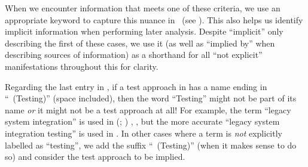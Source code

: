 
When we encounter information that meets one of these criteria, we use an
appropriate keyword to capture this nuance in \ourApproachGlossary{}\ifnotpaper\
    (see )\fi. This also helps us identify implicit
information when performing later analysis. Despite ``implicit'' only
describing the first of these cases, we use it (as well as ``implied by'' when
describing sources of information) as a shorthand for all ``not explicit''
manifestations throughout this \docType{} for clarity.

\ifnotpaper
    

    Regarding the last entry in , if a test approach in
    \ourApproachGlossary{} has a name ending in ``~(Testing)'' (space
    included), then the word ``Testing'' might not be part of its name
    \emph{or} it might not be a test approach at all! For example, the term
    ``legacy system integration'' is used in \ifnotpaper
        \citeauthor{Gerrard2000a} (\citeyear[pp.~12\==13, Tab.~2]{Gerrard2000a};
        \citeyear[Tab.~1]{Gerrard2000b})\else
        \cite[pp.~12\==13, Tab.~2]{Gerrard2000a},
        \cite[Tab.~1]{Gerrard2000b}\fi, but the more accurate
    ``legacy system integration testing'' is used in
    \citeyearpar[pp.~30\==31]{Gerrard2000b}. In other cases where a
    term is \emph{not} explicitly labelled as ``testing'', we add the
    suffix ``~(Testing)'' (when it makes sense to do so) and consider
    the test approach to be implied.
\fi

